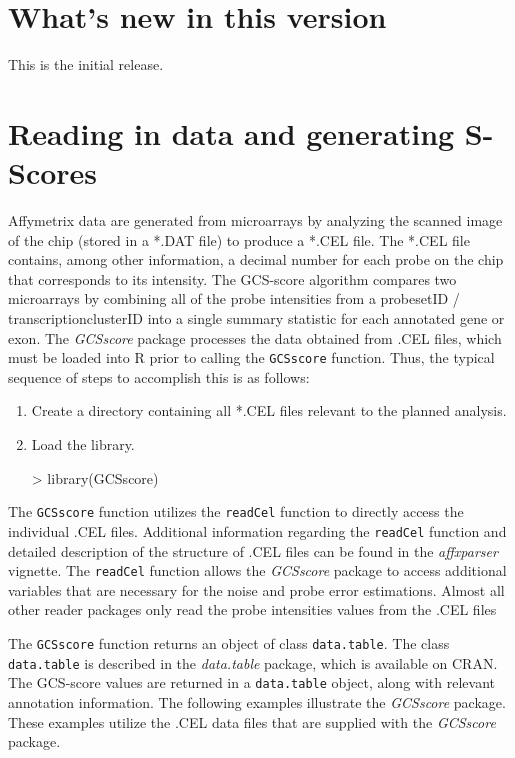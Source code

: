 \documentclass[12pt]{article}
\newcommand{\Rfunction}[1]{{\texttt{#1}}}
\newcommand{\Robject}[1]{{\texttt{#1}}}
\newcommand{\Rpackage}[1]{{\textit{#1}}}
\begin{document}
\section{What's new in this version}
This is the initial release.

\section{Reading in data and generating S-Scores}
Affymetrix data are generated from microarrays by analyzing the scanned 
image of the chip (stored in a *.DAT file) to produce a *.CEL file. The 
*.CEL file contains, among other information, a decimal number for each 
probe on the chip that corresponds to its intensity. The GCS-score algorithm 
compares two microarrays by combining all of the probe intensities from a 
probesetID / transcriptionclusterID into a single summary statistic for each annotated gene or exon. 
The \Rpackage{GCSscore} package processes the data obtained from .CEL files, which must be 
loaded into R prior to calling the \Rfunction{GCSscore} function. Thus, the typical 
sequence of steps to accomplish this is as follows:

\begin{enumerate}
\item Create a directory containing all *.CEL files relevant to the planned analysis.
\item Load the library.

\begin{Schunk}
\begin{Sinput}
> library(GCSscore)
\end{Sinput}
\end{Schunk}

\end{enumerate}

The \Rfunction{GCSscore} function utilizes the \Rfunction{readCel} function to directly access the individual .CEL files. Additional information regarding the \Rfunction{readCel} function and detailed description of the structure of .CEL files can be found in the \Rpackage{affxparser} vignette. The \Rfunction{readCel} function allows the \Rpackage{GCSscore} package to access additional variables that are necessary for the noise and probe error estimations.  Almost all other reader packages only read the probe intensities values from the .CEL files

The \Rfunction{GCSscore} function returns an object of class \Robject{data.table}. The class \Robject{data.table} is described in the \Rpackage{data.table} package, which is available on CRAN. The GCS-score values are returned in a \Robject{data.table} object, along with relevant annotation information.  The following examples illustrate the \Rpackage{GCSscore} package. These examples utilize the .CEL data files that are supplied with the \Rpackage{GCSscore} package.
\end{document}
